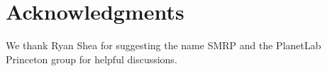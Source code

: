 \section*{Acknowledgments}

We thank Ryan Shea for suggesting the name SMRP and the PlanetLab Princeton group for helpful discussions.
